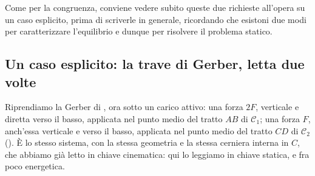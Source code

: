 %


Come per la congruenza, conviene
vedere subito queste due richieste all'opera su un caso esplicito, prima
di scriverle in generale, ricordando che esistoni due modi per caratterizzare l'equilibrio e dunque per risolvere il problema statico.

\subsection{Un caso esplicito: la trave di Gerber, letta due volte}\label{sec:gerber_equilibrio}

Riprendiamo la Gerber di , ora sotto un carico
attivo: una forza $2F$, verticale e diretta verso il basso, applicata nel
punto medio del tratto $AB$ di $\mathcal{C}_1$; una forza $F$, anch'essa
verticale e verso il basso, applicata nel punto medio del tratto
$CD$ di $\mathcal{C}_2$ (). È lo stesso
sistema, con la stessa geometria e la stessa cerniera interna in $C$, che
abbiamo già letto in chiave cinematica: qui lo leggiamo in chiave
statica, e fra poco energetica.


